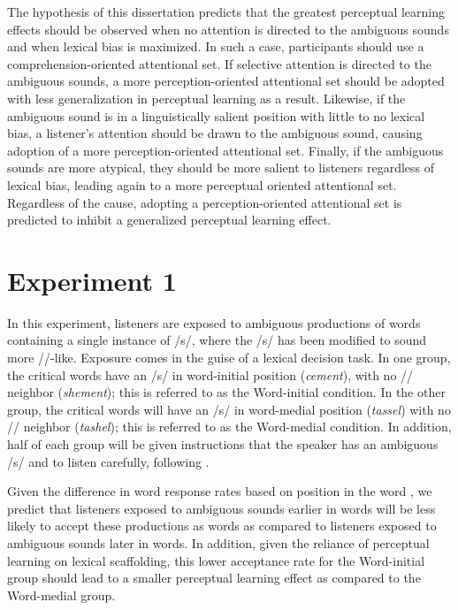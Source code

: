 The hypothesis of this dissertation predicts that the greatest perceptual learning effects should be observed when no attention is directed to the ambiguous sounds and when lexical bias is maximized.  
In such a case, participants should use a comprehension-oriented attentional set.  
If selective attention is directed to the ambiguous sounds, a more perception-oriented attentional set should be adopted with less generalization in perceptual learning as a result. 
Likewise, if the ambiguous sound is in a linguistically salient position with little to no lexical bias, a listener's attention should be drawn to the ambiguous sound, causing adoption of a more perception-oriented attentional set.  
Finally, if the ambiguous sounds are more atypical, they should be more salient to listeners regardless of lexical bias, leading again to a more perceptual oriented attentional set.  
Regardless of the cause, adopting a perception-oriented attentional set is predicted to inhibit a generalized perceptual learning effect.

\section{Experiment 1}

In this experiment, listeners are exposed to ambiguous productions of words containing a single instance of /s/, where the /s/ has been modified to sound more /\textesh/-like.
Exposure comes in the guise of a lexical decision task. 
In one group, the critical words have an /s/ in word-initial position (\emph{cement}), with no /\textesh/ neighbor (\emph{shement}); this is referred to as the Word-initial condition.  
In the other group, the critical words will have an /s/ in word-medial position (\emph{tassel}) with no /\textesh/ neighbor (\emph{tashel}); this is referred to as the Word-medial condition.  
In addition, half of each group will be given instructions that the speaker has an ambiguous /s/ and to listen carefully, following \citet{Pitt2012}.

Given the difference in word response rates based on position in the word \citep{Pitt2012}, we predict that listeners exposed to ambiguous sounds earlier in words will be less likely to accept these productions as words as compared to listeners exposed to ambiguous sounds later in words.  
In addition, given the reliance of perceptual learning on lexical scaffolding, this lower acceptance rate for the Word-initial group should lead to a smaller perceptual learning effect as compared to the Word-medial group.

